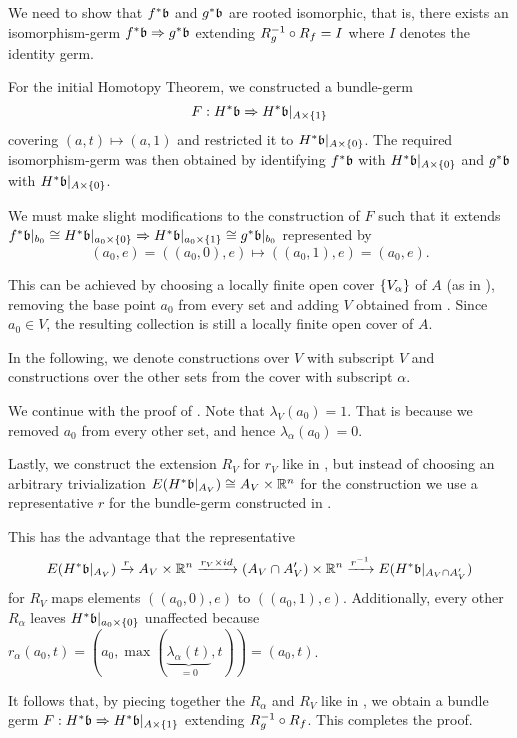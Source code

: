 \begin{myproof}
    We need to show that $\ind{f}\bb$ and $\ind{g}\bb$ are rooted isomorphic,
    that is, there exists an isomorphism-germ $\germ{\ind{f}\bb}{\ind{g}\bb}$
    extending $R_g^{-1} \circ R_f = I$
    where $I$ denotes the identity germ.

    For the initial Homotopy Theorem,
    we constructed a bundle-germ
    \[ \germdef{F}{\ind{H}\bb}{\ind{H}\bb[\cylup{A}]} \]
    covering $(a, t) \mapsto (a, 1)$
    and restricted it to $\ind{H}\bb[\cyldown{A}]$.
    The required isomorphism-germ was then obtained by
    identifying $\ind{f}\bb$ with $\ind{H}\bb[\cyldown{A}]$ and
    $\ind{g}\bb$ with $\ind{H}\bb[\cyldown{A}]$.

    We must make slight modifications
    to the construction of $F$ such that it extends
    $\germ{\ind{f}\bbb \cong \ind{H}\bb[\cyldown{a_0}]}{\ind{H}\bb[\cylup{a_0}] \cong \ind{g}\bbb}$
    represented by
    \[ (a_0, e) = ((a_0, 0), e) \mapsto ((a_0, 1), e) = (a_0, e). \]

    This can be achieved by choosing a locally finite open cover $\{V_\alpha\}$
    of $A$ (as in ), removing the base point $a_0$ from every set
    and adding $V$ obtained from .
    Since $a_0 \in V$, the resulting collection is still a
    locally finite open cover of $A$.
    
    In the following, we denote constructions over $V$
    with subscript $V$ and constructions over the other sets
    from the cover with subscript $\alpha$.

    We continue with the proof of .
    Note that $\lambda_V(a_0) = 1$.
    That is because we removed $a_0$ from every other set, and hence $\lambda_\alpha(a_0) = 0$.

    Lastly, we construct the extension $R_V$ for $r_V$
    like in ,
    but instead of choosing an arbitrary trivialization
    $E(\ind{H}\bb\restr{A_V}) \cong A_V \cross \R^n$
    for the construction we use a representative $r$
    for the bundle-germ constructed in .
    
    This has the advantage that the representative
    \[
        E(\ind{H}\bb[A_V]) \xto{r}
        A_V \cross \R^n \xto{r_V \cross id} (A_V \cap A'_V) \cross \R^n
        \xto{\inv{r}} E(\ind{H}\bb[A_V \cap A'_V])
    \]
    for $R_V$ maps elements $((a_0, 0), e)$ to $((a_0, 1), e)$.
    Additionally,
    every other $R_\alpha$ leaves $\ind{H}\bb[\cyldown{a_0}]$ unaffected
    because $r_\alpha(a_0, t) = (a_0, \max(\underbrace{\lambda_\alpha(t)}_{= 0}, t)) = (a_0, t)$.

    It follows that, by piecing together the $R_\alpha$ and $R_V$ like in ,
    we obtain a bundle germ $\germdef{F}{\ind{H}\bb}{\ind{H}\bb[\cylup{A}]}$
    extending $R_g^{-1} \circ R_f$.
    This completes the proof.
\end{myproof}
